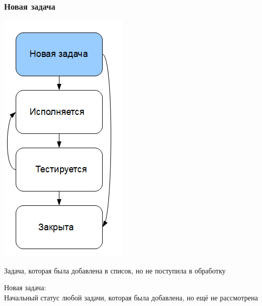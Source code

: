 \documentclass{../industrial-development}
\begin{document}
\begin{frame} \frametitle{Новая задача}
\begin{minipage}{0.4\textwidth}
  \begin{flushleft}
		\includegraphics[height=0.8\textheight]{cyc2.png}
  \end{flushleft}
\end{minipage}
\begin{minipage}{0.59\textwidth}
  \begin{flushright}
		\begin{block}{}
			Задача, которая была добавлена в список, но не поступила в обработку
		\end{block}
  \end{flushright}
\end{minipage}
\end{frame}
\lecturenotes
Новая задача:\\
Начальный статус любой задачи, которая была добавлена, но ещё не рассмотрена
\end{document}
